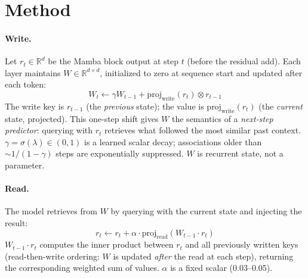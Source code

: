 \documentclass{article}
\begin{document}
\section{Method}
\label{sec:method}

\paragraph{Write.}
Let $r_t \in \mathbb{R}^d$ be the Mamba block output at step $t$ (before the residual add). Each layer maintains $W \in \mathbb{R}^{d \times d}$, initialized to zero at sequence start and updated after each token:
\begin{equation}
    W_t \leftarrow \gamma W_{t-1} + \text{proj}_\text{write}(r_t) \otimes r_{t-1}
\end{equation}
The write key is $r_{t-1}$ (the \emph{previous} state); the value is $\text{proj}_\text{write}(r_t)$ (the \emph{current} state, projected). This one-step shift gives $W$ the semantics of a \emph{next-step predictor}: querying with $r_t$ retrieves what followed the most similar past context. $\gamma = \sigma(\lambda) \in (0,1)$ is a learned scalar decay; associations older than ${\sim}1/(1-\gamma)$ steps are exponentially suppressed. $W$ is recurrent state, not a parameter.

\paragraph{Read.}
The model retrieves from $W$ by querying with the current state and injecting the result:
\begin{equation}
    r_t \leftarrow r_t + \alpha \cdot \text{proj}_\text{read}(W_{t-1} \cdot r_t)
\end{equation}
$W_{t-1} \cdot r_t$ computes the inner product between $r_t$ and all previously written keys (read-then-write ordering: $W$ is updated \emph{after} the read at each step), returning the corresponding weighted sum of values. $\alpha$ is a fixed scalar (0.03--0.05).
\end{document}
